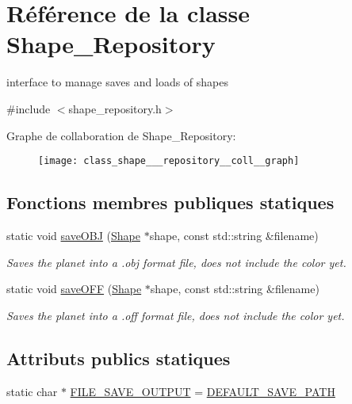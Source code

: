 \hypertarget{class_shape___repository}{}\section{Référence de la classe Shape\+\_\+\+Repository}
\label{class_shape___repository}


interface to manage saves and loads of shapes  




{\ttfamily \#include $<$shape\+\_\+repository.\+h$>$}



Graphe de collaboration de Shape\+\_\+\+Repository\+:
\nopagebreak
\begin{figure}[H]
\begin{center}
\leavevmode
\texttt{[image: class\_shape\_\_\_repository\_\_coll\_\_graph]}
\end{center}
\end{figure}
\subsection*{Fonctions membres publiques statiques}
\begin{DoxyCompactItemize}
\item 
static void \hyperlink{class_shape___repository_a0a0e36f8beab55be3c88e08c823819cd}{save\+O\+BJ} (\hyperlink{class_shape}{Shape} $\ast$shape, const std\+::string \&filename)
\begin{DoxyCompactList}\small\item\em Saves the planet into a .obj format file, does not include the color yet. \end{DoxyCompactList}\item 
static void \hyperlink{class_shape___repository_ad52141b6883d20084a0105355f2271b5}{save\+O\+FF} (\hyperlink{class_shape}{Shape} $\ast$shape, const std\+::string \&filename)
\begin{DoxyCompactList}\small\item\em Saves the planet into a .off format file, does not include the color yet. \end{DoxyCompactList}\end{DoxyCompactItemize}
\subsection*{Attributs publics statiques}
\begin{DoxyCompactItemize}
\item 
static char $\ast$ \hyperlink{class_shape___repository_a86acda4a6616af042c18e10f16a57230}{F\+I\+L\+E\+\_\+\+S\+A\+V\+E\+\_\+\+O\+U\+T\+P\+UT} = \hyperlink{shape__repository_8h_acc70ede7a11e005b3c50aa3efb048ddf}{D\+E\+F\+A\+U\+L\+T\+\_\+\+S\+A\+V\+E\+\_\+\+P\+A\+TH}
\end{DoxyCompactItemize}


